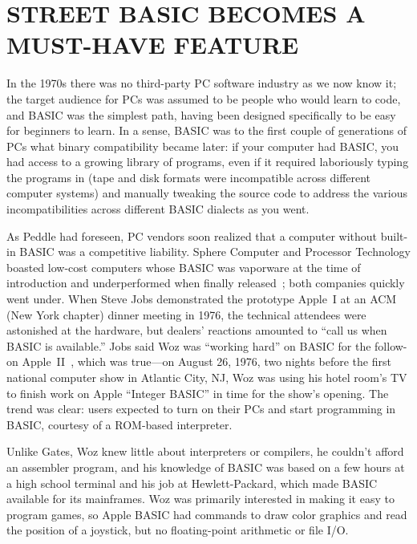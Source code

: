 
\section{STREET BASIC BECOMES A MUST-HAVE FEATURE}


In the 1970s there was no third-party PC software industry as we now know
it; 
the target audience for PCs was assumed to be people who would learn to code,
and BASIC was the simplest
path, having been designed specifically to be easy for beginners to learn.
In a sense, BASIC was to the first couple of generations of PCs what
binary compatibility became later: if your computer had BASIC,
you had access to a growing library of programs, even if it
required laboriously typing the programs in (tape and disk formats were
incompatible across different computer systems) and  manually tweaking
the source code to address the various incompatibilities across
different BASIC dialects as you went.

As Peddle had foreseen, PC vendors soon realized that a computer without
built-in BASIC was a competitive liability.
Sphere Computer and Processor Technology boasted low-cost computers
whose BASIC was vaporware at the time of introduction and underperformed
when finally released~\cite[p. 114, 134]{veit}; both companies quickly
went under.
When Steve Jobs demonstrated the prototype Apple~I at an ACM (New York
chapter) dinner meeting in 1976, the technical attendees were astonished at the
hardware, but dealers' reactions amounted to ``call us when BASIC is
available.''
Jobs said Woz was ``working hard'' on BASIC for the follow-on
Apple~II~\cite[pp. 92ff]{veit}, which 
was true---on August 26, 1976, two nights before the first national computer show in
Atlantic City, NJ, Woz was using his hotel room's TV to finish work on
Apple ``Integer BASIC'' in time for the show's opening.
The trend was clear: users expected to turn on their PCs and
start programming in BASIC, courtesy of a ROM-based interpreter.

\begin{tangent}
Unlike Gates, Woz knew little about interpreters or compilers, he
couldn't afford an assembler program, and his knowledge of BASIC was
based on a few hours at a high school terminal and his job at
Hewlett-Packard, which made BASIC available for its
mainframes.
Woz was primarily interested in making it easy to program games,
so Apple BASIC had
commands to draw color graphics and read the position of a joystick,
but no floating-point arithmetic or file I/O.
\end{tangent}


